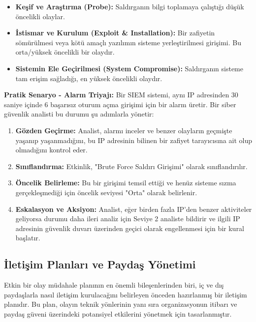 \begin{itemize}
    \item \textbf{Keşif ve Araştırma (Probe):} Saldırganın bilgi toplamaya çalıştığı düşük öncelikli olaylar.
    \item \textbf{İstismar ve Kurulum (Exploit \& Installation):} Bir zafiyetin sömürülmesi veya kötü amaçlı yazılımın sisteme yerleştirilmesi girişimi. Bu orta/yüksek öncelikli bir olaydır.
    \item \textbf{Sistemin Ele Geçirilmesi (System Compromise):} Saldırganın sisteme tam erişim sağladığı, en yüksek öncelikli olaydır.
\end{itemize}
\textbf{Pratik Senaryo - Alarm Triyajı:}
Bir SIEM sistemi, aynı IP adresinden 30 saniye içinde 6 başarısız oturum açma girişimi için bir alarm üretir. Bir siber güvenlik analisti bu durumu şu adımlarla yönetir:
\begin{enumerate}
    \item \textbf{Gözden Geçirme:} Analist, alarmı inceler ve benzer olayların geçmişte yaşanıp yaşanmadığını, bu IP adresinin bilinen bir zafiyet tarayıcısına ait olup olmadığını kontrol eder.
    \item \textbf{Sınıflandırma:} Etkinlik, "Brute Force Saldırı Girişimi" olarak sınıflandırılır.
    \item \textbf{Öncelik Belirleme:} Bu bir girişimi temsil ettiği ve henüz sisteme sızma gerçekleşmediği için öncelik seviyesi "Orta" olarak belirlenir.
    \item \textbf{Eskalasyon ve Aksiyon:} Analist, eğer birden fazla IP'den benzer aktiviteler geliyorsa durumu daha ileri analiz için Seviye 2 analiste bildirir ve ilgili IP adresinin güvenlik duvarı üzerinden geçici olarak engellenmesi için bir kural başlatır.
\end{enumerate}

\subsection{İletişim Planları ve Paydaş Yönetimi}

Etkin bir olay müdahale planının en önemli bileşenlerinden biri, iç ve dış paydaşlarla nasıl iletişim kurulacağını belirleyen önceden hazırlanmış bir iletişim planıdır. Bu plan, olayın teknik yönlerinin yanı sıra organizasyonun itibarı ve paydaş güveni üzerindeki potansiyel etkilerini yönetmek için tasarlanmıştır.

